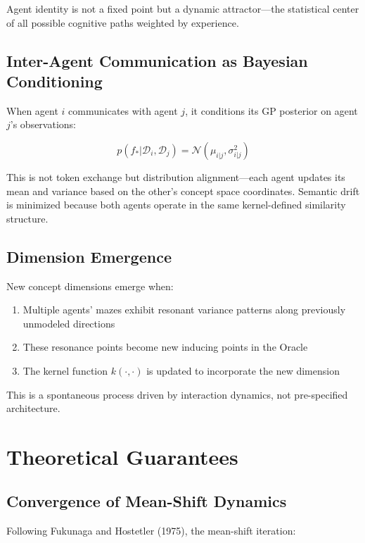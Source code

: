 \documentclass[11pt]{article}
\begin{document}
Agent identity is not a fixed point but a dynamic attractor---the statistical center of all possible cognitive paths weighted by experience.

\subsection{Inter-Agent Communication as Bayesian Conditioning}

When agent $i$ communicates with agent $j$, it conditions its GP posterior on agent $j$'s observations:

\begin{equation}
p(f_* | \mathcal{D}_i, \mathcal{D}_j) = \mathcal{N}(\mu_{i|j}, \sigma^2_{i|j})
\end{equation}

This is not token exchange but distribution alignment---each agent updates its mean and variance based on the other's concept space coordinates. Semantic drift is minimized because both agents operate in the same kernel-defined similarity structure.

\subsection{Dimension Emergence}

New concept dimensions emerge when:
\begin{enumerate}
    \item Multiple agents' mazes exhibit resonant variance patterns along previously unmodeled directions
    \item These resonance points become new inducing points in the Oracle
    \item The kernel function $k(\cdot, \cdot)$ is updated to incorporate the new dimension
\end{enumerate}

This is a spontaneous process driven by interaction dynamics, not pre-specified architecture.

\section{Theoretical Guarantees}

\subsection{Convergence of Mean-Shift Dynamics}

Following Fukunaga and Hostetler (1975), the mean-shift iteration:
\end{document}
